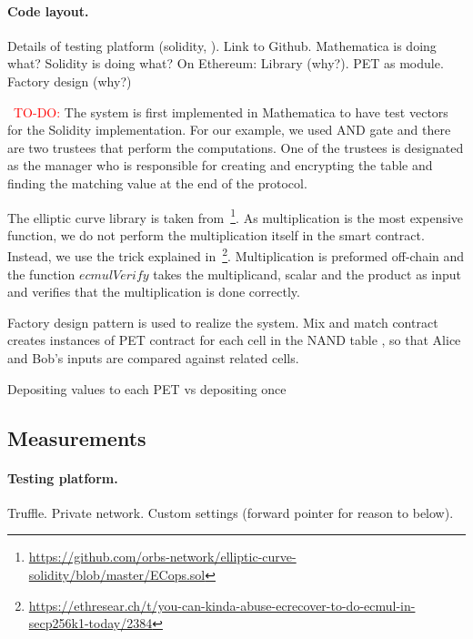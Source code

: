 
\paragraph{Code layout.} Details of testing platform (solidity, \etc). Link to Github. Mathematica is doing what? Solidity is doing what? On Ethereum: Library (why?). PET as module. Factory design (why?) 

~\textcolor{red}{TO-DO:}
The system is first implemented in Mathematica to have test vectors for the Solidity implementation. For our example, we used AND gate and there are two trustees that perform the computations. One of the trustees is designated as the manager who is responsible for creating and encrypting the table and finding the matching value at the end of the protocol.

The elliptic curve library is taken from~\footnote{\url{https://github.com/orbs-network/elliptic-curve-solidity/blob/master/ECops.sol}}. As multiplication is the most expensive function, we do not perform the multiplication itself in the smart contract. Instead, we use the trick explained in~\footnote{\url{https://ethresear.ch/t/you-can-kinda-abuse-ecrecover-to-do-ecmul-in-secp256k1-today/2384}}. Multiplication is preformed off-chain and the function $ecmulVerify$ takes the multiplicand, scalar and the product as input and verifies that the multiplication is done correctly.

Factory design pattern is used to realize the system. Mix and match contract creates instances of PET contract for each cell in the NAND table , so that Alice and Bob's inputs are compared against related cells.

Depositing values to each PET vs depositing once


\subsection{Measurements}


\paragraph{Testing platform.} Truffle. Private network. Custom settings (forward pointer for reason to below). 

